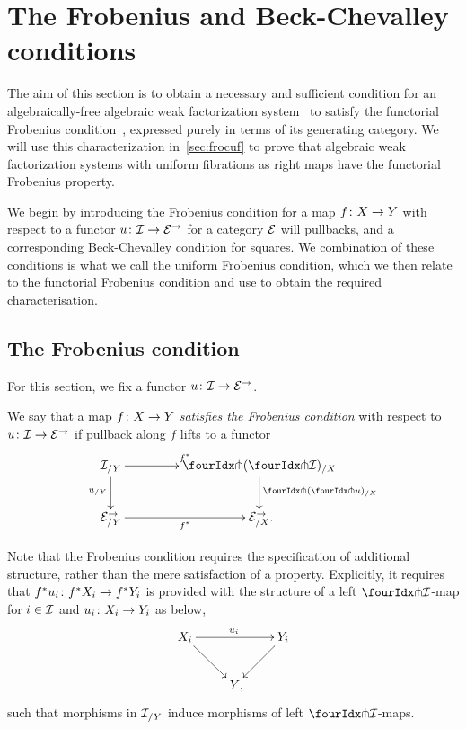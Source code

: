 \documentclass[reqno,10pt,a4paper,oneside,draft]{amsart}
\begin{document}
\section{The Frobenius and Beck-Chevalley conditions}
\label{sec:frobc}

The aim of this section is to obtain a necessary and sufficient condition for an algebraically-free algebraic weak factorization system~\cite{garner:small-object-argument} to satisfy the functorial Frobenius condition~\cite{garner:topological-simplicial}, expressed purely in terms of its generating category.
We will use this characterization in~\cref{sec:frocuf} to prove that algebraic weak factorization systems with uniform fibrations as right maps have the functorial Frobenius property.

We begin by introducing the Frobenius condition for a map $f \co X \to Y$ with respect to a functor $u \co \cal{I} \to \catE^\to$ for a category $\cal{E}$ will pullbacks, and a corresponding Beck-Chevalley condition for squares.
We combination of these conditions is what we call the uniform Frobenius condition, which we then relate to the functorial Frobenius condition and use to obtain the required characterisation.

\subsection*{The Frobenius condition}

For this section, we fix a functor $u \co \cal{I} \to \catE^\to$.

\begin{definition} \label{thm:frobenius-def}
We say that a map $f \co X \to Y$ \emph{satisfies the Frobenius condition} with respect to $u \co \cal{I} \to \cal{E}^\to$ if pullback along $f$ lifts to a functor
\[
\xymatrix@C=1.5cm{
  \cal{I}_{/Y}
  \ar[r]^{f^*}
  \ar[d]_{u_{/Y}}
&
  \liftl{(\liftr{\cal{I}})}_{/X}
  \ar[d]^{\liftl{(\liftr{u})}_{/X}}
\\
  \catE_{/Y}^\to \ar[r]_{f^*}
&
  \catE_{/X}^\to
\rlap{.}}
\]
\end{definition}

\begin{remark} \label{frobenius-no-coherence}
Note that the Frobenius condition requires the specification of additional structure, rather than the mere satisfaction of a property.
Explicitly, it requires that $f^* u_i \co f^* X_i \to f^* Y_i$ is provided with the structure of a left $\liftr{\cal{I}}$-map for $i \in \cal{I}$ and $u_i \co X_i \to Y_i$ as below,
\[
\xymatrix{
  X_i
  \ar[dr]
  \ar[rr]^{u_i}
&&
  Y_i
  \ar[dl]
\\&
   Y
\rlap{,}}
\]
such that morphisms in $\cal{I}_{/Y}$ induce morphisms of left $\liftr{\cal{I}}$-maps.
\end{remark}
\end{document}
